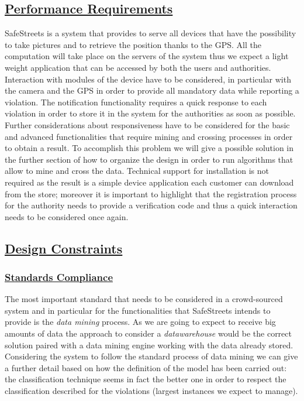 	\subsection[Performance Requirements]{\hyperlink{toc}{Performance Requirements}}
		SafeStreets is a system that provides to serve all devices that have the possibility to take pictures and to retrieve the position thanks to the GPS. All the computation will take place on the servers of the system thus we expect a light weight application that can be accessed by both the users and authorities. Interaction with modules of the device have to be considered, in particular with the camera and the GPS in order to provide all mandatory data while reporting a violation. The notification functionality requires a quick response to each violation in order to store it in the system for the authorities as soon as possible. Further considerations about responsiveness have to be considered for the basic and advanced functionalities that require mining and crossing processes in order to obtain a result. To accomplish this problem we will give a possible solution in the further section of how to organize the design in order to run algorithms that allow to mine and cross the data. Technical support for installation is not required as the result is a simple device application each customer can download from the store; moreover it is important to highlight that the registration process for the authority needs to provide a verification code and thus a quick interaction needs to be considered once again.
	
	\subsection[Design Constraints]{\hyperlink{toc}{Design Constraints}}
		\subsubsection[Standards Compliance]{\hyperlink{toc}{Standards Compliance}}
			\label{sec:standardCompliance}
			The most important standard that needs to be considered in a crowd-sourced system and in particular for the functionalities that SafeStreets intends to provide is the \emph{data mining} process. As we are going to expect to receive big amounts of data the approach to consider a \emph{datawarehouse} would be the correct solution paired with a data mining engine working with the data already stored. Considering the system to follow the standard process of data mining we can give a further detail based on how the definition of the model has been carried out: the classification technique seems in fact the better one in order to respect the classification described for the violations (largest instances we expect to manage). 
